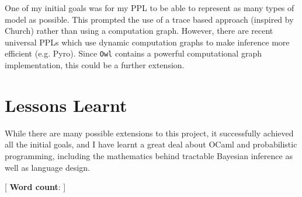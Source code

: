 One of my initial goals was for my PPL to be able to represent as many types of model as possible. This prompted the use of a trace based approach (inspired by Church) rather than using a computation graph. However, there are recent universal PPLs which use dynamic computation graphs to make inference more efficient (e.g. Pyro). Since \texttt{Owl} contains a powerful computational graph implementation, this could be a further extension.

\section{Lessons Learnt}
While there are many possible extensions to this project, it successfully achieved all the initial goals, and I have learnt a great deal about OCaml and probabilistic programming, including the mathematics behind tractable Bayesian inference as well as language design.

\mbox{}
\vfill
[ {\small \textbf{Word count}: }]